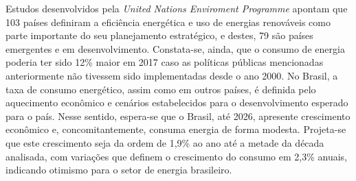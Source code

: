 \begin{onehalfspace}
    \noindent Estudos desenvolvidos pela \textit{United Nations Enviroment Programme}
    apontam que 103 países definiram a eficiência energética e uso de energias 
    renováveis como parte importante do seu planejamento estratégico, e destes, 
    79 são países emergentes e em desenvolvimento. Constata-se, ainda, que o 
    consumo de energia poderia ter sido 12\% maior em 2017 caso as políticas 
    públicas mencionadas anteriormente não tivessem sido implementadas desde o ano 2000.\vspace*{0.3cm} \newline
    \noindent No Brasil, a taxa de consumo energético, assim como em outros países, 
    é definida pelo aquecimento econômico e cenários estabelecidos para o desenvolvimento 
    esperado para o país. Nesse sentido, espera-se que o Brasil, até 2026, apresente 
    crescimento econômico e, concomitantemente, consuma energia de forma modesta. 
    Projeta-se que este crescimento seja da ordem de 1,9\% ao ano até a metade da 
    década analisada, com variações que definem o crescimento do consumo em 2,3\% 
    anuais, indicando otimismo para o setor de energia brasileiro.\vspace*{0.3cm} \newline
\end{onehalfspace}
